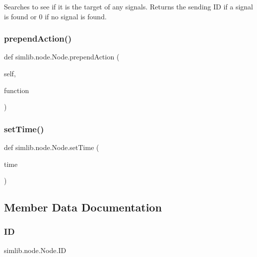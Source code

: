 \begin{DoxyVerb}Searches to see if it is the target of any signals. Returns the sending ID
if a signal is found or 0 if no signal is found.
\end{DoxyVerb}
 \mbox{\label{classsimlib_1_1node_1_1_node_a6ddb478f68f40125776533ea5c4f03b0}} 
\subsubsection{\texorpdfstring{prepend\+Action()}{prependAction()}}
{\footnotesize\ttfamily def simlib.\+node.\+Node.\+prepend\+Action (\begin{DoxyParamCaption}\item[{}]{self,  }\item[{}]{function }\end{DoxyParamCaption})}

\mbox{\label{classsimlib_1_1node_1_1_node_a974a9b9f6f25605316255eb0e66e9f56}} 
\subsubsection{\texorpdfstring{set\+Time()}{setTime()}}
{\footnotesize\ttfamily def simlib.\+node.\+Node.\+set\+Time (\begin{DoxyParamCaption}\item[{}]{time }\end{DoxyParamCaption})}



\subsection{Member Data Documentation}
\mbox{\label{classsimlib_1_1node_1_1_node_af8798fcb88771789fce24e31e36b19af}} 
\subsubsection{\texorpdfstring{ID}{ID}}
{\footnotesize\ttfamily simlib.\+node.\+Node.\+ID}

